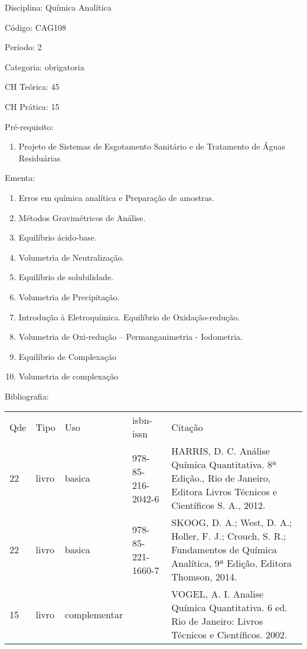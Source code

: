 \documentclass[12pt,a4paper,twoside]{report}
\begin{document}
Disciplina: Química Analítica

Código: CAG108

Período: 2

Categoria: obrigatoria

CH Teórica: 45

CH Prática: 15




Pré-requisito:
\begin{enumerate}
\item Projeto de Sistemas de Esgotamento Sanitário e de Tratamento de Águas Residuárias
\end{enumerate}

Ementa:
\begin{enumerate}
\item Erros em química analítica e Preparação de amostras.
\item Métodos Gravimétricos de Análise.
\item Equilíbrio ácido-base.
\item Volumetria de Neutralização.
\item Equilíbrio de solubilidade.
\item Volumetria de Precipitação.
\item Introdução à Eletroquímica.  Equilíbrio de Oxidação-redução.
\item Volumetria de Oxi-redução – Permanganimetria -  Iodometria.
\item Equilíbrio de Complexação
\item Volumetria de complexação
\end{enumerate}



Bibliografia:


\begin{tabular}{llllp{8cm}}
Qde & Tipo & Uso & isbn-issn & Citação \\
22&livro&basica&978-85-216-2042-6&HARRIS, D. C. Análise Química Quantitativa. 8ª Edição., Rio de Janeiro, Editora  Livros Técnicos e Científicos S. A., 2012.\\
22&livro&basica&978-85-221-1660-7&SKOOG, D. A.; West, D. A.; Holler, F. J.; Crouch, S. R.; Fundamentos de Química Analítica, 9ª Edição, Editora Thomson, 2014.\\
15&livro&complementar&&VOGEL, A. I. Analise Química Quantitativa. 6 ed. Rio de Janeiro: Livros Técnicos e Científicos. 2002.\\
\end{tabular}
\end{document}
